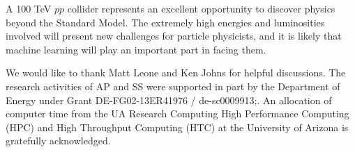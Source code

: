 \documentclass[a4paper,11pt]{article}
\begin{document}
A 100 TeV $pp$ collider represents an excellent opportunity to discover
physics beyond the Standard Model. The extremely high energies and luminosities
involved will present new challenges for particle physicists, and it is likely
that machine learning will play an important part in facing them. 
  
\acknowledgments

We would like to thank Matt Leone and Ken Johns for helpful discussions.  The
research activities of AP and SS were supported in part by the Department of
Energy under Grant DE-FG02-13ER41976 / de-sc0009913;. An allocation of computer
time from the UA Research Computing High Performance Computing (HPC) and High
Throughput Computing (HTC) at the University of Arizona is gratefully
acknowledged.


\end{document}
